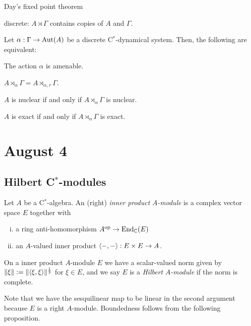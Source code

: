 \documentclass{../../../small}
\begin{document}
Day's fixed point theorem

discrete: $A\rtimes\Gamma$ contains copies of $A$ and $\Gamma$.

\begin{thm}
Let $\alpha:\Gamma\to\operatorname{Aut}(A)$ be a discrete C$^*$-dynamical system.
Then, the following are equivalent:
\begin{parts}
\item The action $\alpha$ is amenable.
\item $A\rtimes_\alpha\Gamma= A\rtimes_{\alpha,r}\Gamma$.
\item $A$ is nuclear if and only if $A\rtimes_\alpha\Gamma$ is nuclear.
\item $A$ is exact if and only if $A\rtimes_\alpha\Gamma$ is exact.
\end{parts}
\end{thm}
\fi


\newpage
\section{August 4}

\subsection{Hilbert C$^*$-modules}

\begin{defn}
Let $A$ be a C$^*$-algebra.
An (right) \emph{inner product $A$-module} is a complex vector space $E$ together with
\begin{enumerate}[(i)]
\item a ring anti-homomorphism $A^{\mathrm{op}}\to\operatorname{End}_{\mathbb{C}}(E)$
\item an $A$-valued inner product $\langle-,-\rangle:E\times E\to A$.
\end{enumerate}
On a inner product $A$-module $E$ we have a scalar-valued norm given by $\|\xi\|:=\|\langle\xi,\xi\rangle\|^{\frac12}$ for $\xi\in E$, and we say $E$ is a \emph{Hilbert $A$-module} if the norm is complete.
\end{defn}

Note that we have the sesquilinear map to be linear in the second argument because $E$ is a right $A$-module.
Boundedness follows from the following proposition.
\end{document}
